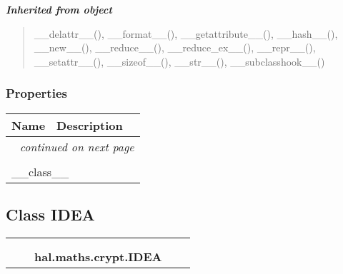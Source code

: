 \large{\textbf{\textit{Inherited from object}}}

\begin{quote}
\_\_delattr\_\_(), \_\_format\_\_(), \_\_getattribute\_\_(), \_\_hash\_\_(), \_\_new\_\_(), \_\_reduce\_\_(), \_\_reduce\_ex\_\_(), \_\_repr\_\_(), \_\_setattr\_\_(), \_\_sizeof\_\_(), \_\_str\_\_(), \_\_subclasshook\_\_()
\end{quote}


  \subsubsection{Properties}

    \vspace{-1cm}
\hspace{\varindent}\begin{longtable}{|p{\varnamewidth}|p{\vardescrwidth}|l}
\cline{1-2}
\cline{1-2} \centering \textbf{Name} & \centering \textbf{Description}& \\
\cline{1-2}
\endhead\cline{1-2}\multicolumn{3}{r}{\small\textit{continued on next page}}\\\endfoot\cline{1-2}
\endlastfoot\multicolumn{2}{|l|}{\textit{Inherited from object}}\\
\multicolumn{2}{|p{\varwidth}|}{\raggedright \_\_class\_\_}\\
\cline{1-2}
\end{longtable}



\subsection{Class IDEA}

    \label{hal:maths:crypt:IDEA}
\begin{tabular}{cccccc}
\multicolumn{2}{r}{\settowidth{\BCL}{object}\multirow{2}{\BCL}{object}}
&&
  \\\cline{3-3}
  &&\multicolumn{1}{c|}{}
&&
  \\
&&\multicolumn{2}{l}{\textbf{hal.maths.crypt.IDEA}}
\end{tabular}

